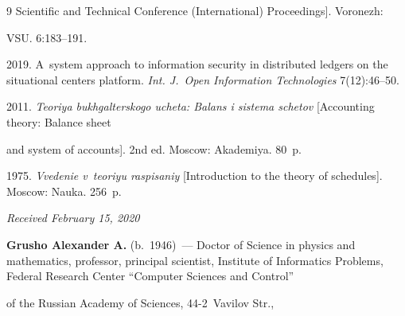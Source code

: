 {{\begin{thebibliography}{9}
Scientific and Technical Conference (International) Proceedings]. Voronezh:


VSU. 6:183--191.




 2019. A~system approach to information security in distributed ledgers on the situational centers platform. \textit{Int. J.~Open Information Technologies} 7(12):46--50.




 2011. \textit{Teoriya bukhgalterskogo ucheta: Balans i sistema schetov} [Accounting theory: Balance sheet 


and system of accounts]. 2nd ed. Moscow: Akademiya. 80~p.




 1975. \textit{Vvedenie v~teoriyu raspisaniy} [Introduction to the theory of schedules]. Moscow: Nauka. 256~p.


          \end{thebibliography}


        } }


        


        




        


        \hfill{\small\textit{Received February 15, 2020}} 


        













\Contr





\noindent


\textbf{Grusho Alexander A.} (b.\ 1946)~--- Doctor of Science in physics and mathematics, professor, principal scientist, Institute of Informatics Problems, Federal Research Center ``Computer Sciences and Control''


 of the Russian Academy of Sciences, 44-2~Vavilov Str., 


